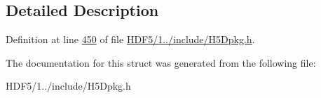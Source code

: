 \subsection{Detailed Description}


Definition at line \hyperlink{_h_d_f5_21_810_81_2include_2_h5_dpkg_8h_source_l00450}{450} of file \hyperlink{_h_d_f5_21_810_81_2include_2_h5_dpkg_8h_source}{H\+D\+F5/1../include/\+H5\+Dpkg.\+h}.



The documentation for this struct was generated from the following file\+:\begin{DoxyCompactItemize}
\item 
H\+D\+F5/1../include/\+H5\+Dpkg.\+h\end{DoxyCompactItemize}
